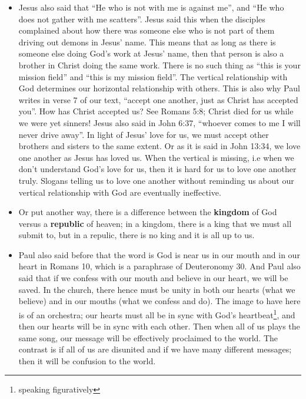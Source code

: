 \begin{itemize}
{  there will be no unity.  It is the name of Jesus, not some institution or
  some brand or project that gives us spiritual unity.}
  \item{Jesus also said that ``He who is not with me is against me'', and
  ``He who does not gather with me scatters''.  Jesus said this when the
  disciples complained about how there was someone else who is not part of
  them driving out demons in Jesus' name.  This means that as long as there
  is someone else doing God's work at Jesus' name, then that person is also a
  brother in Christ doing the same work.  There is no such thing as ``this is
  your mission field'' and ``this is my mission field''.  The vertical
  relationship with God determines our horizontal relationship with others.
  This is also why Paul writes in verse 7 of our text, ``accept one another,
  just as Christ has accepted you''.  How has Christ accepted us?  See
  Romans 5:8; Christ died for us while we were yet sinners!  Jesus also said
  in John 6:37, ``whoever comes to me I will never drive away''.  In light of
  Jesus' love for us, we must accept other brothers and sisters to the same
  extent.  Or as it is said in John 13:34, we love one another as Jesus has
  loved us.  When the vertical is missing, i.e when we don't understand God's
  love for us, then it is hard for us to love one another truly.  Slogans
  telling us to love one another without reminding us about our vertical
  relationship with God are eventually ineffective.  }
  \item{Or put another way, there is a difference between the
  \textbf{kingdom} of God versus a \textbf{republic} of heaven; in a kingdom,
  there is a king that we must all submit to, but in a repulic, there is no
  king and it is all up to us.}
  \item{Paul also said before that the word is God is near us in our mouth
  and in our heart in Romans 10, which is a paraphrase of Deuteronomy 30.
  And Paul also said that if we confess with our mouth and believe in our
  heart, we will be saved.  In the church, there hence must be unity in both
  our hearts (what we believe) and in our mouths (what we confess and do).
  The image to have here is of an orchestra; our hearts must all be in sync
  with God's heartbeat\footnote{speaking figuratively}, and then our hearts
  will be in sync with each other.  Then when all of us plays the same song,
  our message will be effectively proclaimed to the world.  The contrast is
  if all of us are disunited and if we have many different messages; then it
  will be confusion to the world.}

\end{itemize}
